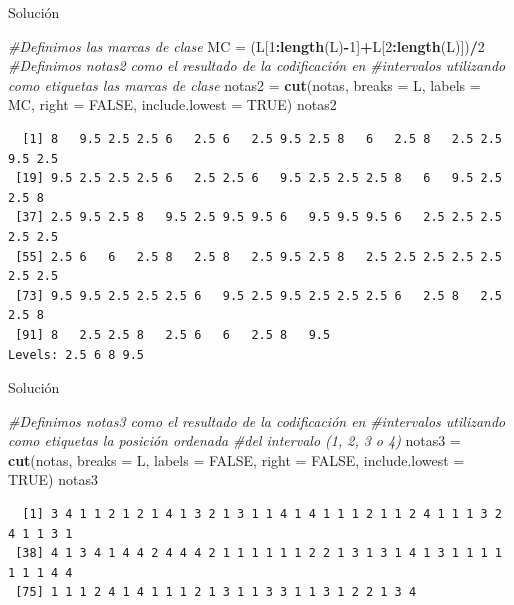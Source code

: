 \documentclass[
  ignorenonframetext,
  aspectratio=169]{beamer}
\newenvironment{Shaded}{\begin{snugshade}}{\end{snugshade}}
\newcommand{\AttributeTok}[1]{\textcolor[rgb]{0.13,0.29,0.53}{#1}}
\newcommand{\CommentTok}[1]{\textcolor[rgb]{0.56,0.35,0.01}{\textit{#1}}}
\newcommand{\ConstantTok}[1]{\textcolor[rgb]{0.56,0.35,0.01}{#1}}
\newcommand{\DecValTok}[1]{\textcolor[rgb]{0.00,0.00,0.81}{#1}}
\newcommand{\FunctionTok}[1]{\textcolor[rgb]{0.13,0.29,0.53}{\textbf{#1}}}
\newcommand{\NormalTok}[1]{#1}
\newcommand{\OtherTok}[1]{\textcolor[rgb]{0.56,0.35,0.01}{#1}}
\newcommand{\SpecialCharTok}[1]{\textcolor[rgb]{0.81,0.36,0.00}{\textbf{#1}}}
\begin{document}
\begin{frame}[fragile]{Solución}
\label{soluciuxf3n-18}
\begin{Shaded}
\begin{Highlighting}[]
\CommentTok{\#Definimos las marcas de clase}
\NormalTok{MC }\OtherTok{=}\NormalTok{ (L[}\DecValTok{1}\SpecialCharTok{:}\FunctionTok{length}\NormalTok{(L)}\SpecialCharTok{{-}}\DecValTok{1}\NormalTok{]}\SpecialCharTok{+}\NormalTok{L[}\DecValTok{2}\SpecialCharTok{:}\FunctionTok{length}\NormalTok{(L)])}\SpecialCharTok{/}\DecValTok{2}
\CommentTok{\#Definimos notas2 como el resultado de la codificación en }
\CommentTok{\#intervalos utilizando como etiquetas las marcas de clase}
\NormalTok{notas2 }\OtherTok{=} \FunctionTok{cut}\NormalTok{(notas, }\AttributeTok{breaks =}\NormalTok{ L, }\AttributeTok{labels =}\NormalTok{ MC, }\AttributeTok{right =} \ConstantTok{FALSE}\NormalTok{, }
             \AttributeTok{include.lowest =} \ConstantTok{TRUE}\NormalTok{)}
\NormalTok{notas2}
\end{Highlighting}
\end{Shaded}

\begin{verbatim}
  [1] 8   9.5 2.5 2.5 6   2.5 6   2.5 9.5 2.5 8   6   2.5 8   2.5 2.5 9.5 2.5
 [19] 9.5 2.5 2.5 2.5 6   2.5 2.5 6   9.5 2.5 2.5 2.5 8   6   9.5 2.5 2.5 8  
 [37] 2.5 9.5 2.5 8   9.5 2.5 9.5 9.5 6   9.5 9.5 9.5 6   2.5 2.5 2.5 2.5 2.5
 [55] 2.5 6   6   2.5 8   2.5 8   2.5 9.5 2.5 8   2.5 2.5 2.5 2.5 2.5 2.5 2.5
 [73] 9.5 9.5 2.5 2.5 2.5 6   9.5 2.5 9.5 2.5 2.5 2.5 6   2.5 8   2.5 2.5 8  
 [91] 8   2.5 2.5 8   2.5 6   6   2.5 8   9.5
Levels: 2.5 6 8 9.5
\end{verbatim}
\end{frame}

\begin{frame}[fragile]{Solución}
\label{soluciuxf3n-19}
\begin{Shaded}
\begin{Highlighting}[]
\CommentTok{\#Definimos notas3 como el resultado de la codificación en }
\CommentTok{\#intervalos utilizando como etiquetas la posición ordenada }
\CommentTok{\#del intervalo (1, 2, 3 o 4)}
\NormalTok{notas3 }\OtherTok{=} \FunctionTok{cut}\NormalTok{(notas, }\AttributeTok{breaks =}\NormalTok{ L, }\AttributeTok{labels =} \ConstantTok{FALSE}\NormalTok{, }\AttributeTok{right =} \ConstantTok{FALSE}\NormalTok{, }
             \AttributeTok{include.lowest =} \ConstantTok{TRUE}\NormalTok{)}
\NormalTok{notas3}
\end{Highlighting}
\end{Shaded}

\begin{verbatim}
  [1] 3 4 1 1 2 1 2 1 4 1 3 2 1 3 1 1 4 1 4 1 1 1 2 1 1 2 4 1 1 1 3 2 4 1 1 3 1
 [38] 4 1 3 4 1 4 4 2 4 4 4 2 1 1 1 1 1 1 2 2 1 3 1 3 1 4 1 3 1 1 1 1 1 1 1 4 4
 [75] 1 1 1 2 4 1 4 1 1 1 2 1 3 1 1 3 3 1 1 3 1 2 2 1 3 4
\end{verbatim}
\end{frame}
\end{document}
